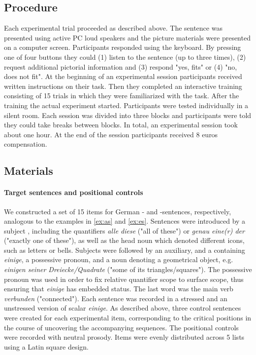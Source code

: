 \documentclass[fleqn,reqno,10pt,draft]{article}
\newcommand{\as}{\acro{as}}
\renewcommand{\es}{\acro{es}}
\begin{document}
\subsection{Procedure}
\label{sec:procedure} 
Each experimental trial proceeded as described above. The sentence was presented using active PC loud speakers and the picture materials were presented on a computer screen. Participants responded using the keyboard. By pressing one of four buttons  they could (1) listen to the sentence (up to three times), (2) request additional pictorial information and (3) respond "yes, fits" or (4) "no, does not fit". At the beginning of an experimental session participants received written instructions on their task. Then they completed an interactive training consisting of 15 trials in which they were familiarized with the task.  After the training the actual experiment started. Participants were tested individually in a silent room. Each session was divided into three blocks and participants were told they could take breaks between blocks. In total, an experimental session took about one hour. At the end of the session participants received 8 euros compensation.     


\subsection{Materials}
\label{sec:materials}


\paragraph{Target sentences and positional controls}

We constructed a set of 15 items for German \as- and \es-sentences,
respectively, analogous to the examples in \ref{ex:as} and
\ref{ex:es}. Sentences were introduced by a subject {\small
  }, including the quantifiers {\it alle diese} ("all of
these") or {\it genau eine(r) der} ("exactly one of these"), as well
as the head noun which denoted different icons, such as letters or
bells. Subjects were followed by an auxiliary, and a {\small
  } containing {\it einige}, a possessive pronoun, and a noun
denoting a geometrical object, e.g. {\it einigen seiner
  Dreiecke/Quadrate} ("some of its triangles/squares"). The possessive
pronoun was used in order to fix relative quantifier scope to surface
scope, thus ensuring that {\it einige} has embedded status. The last
word was the main verb {\it verbunden} ("connected").  Each sentence
was recorded in a stressed and an unstressed version of scalar {\it
  einige}. As described above, three control
sentences were created for each experimental item, corresponding to
the critical positions in the course of uncovering the accompanying
sequences.  The positional controls were recorded with
neutral prosody.  Items were evenly distributed across 5 lists using a
Latin square design.
\end{document}
